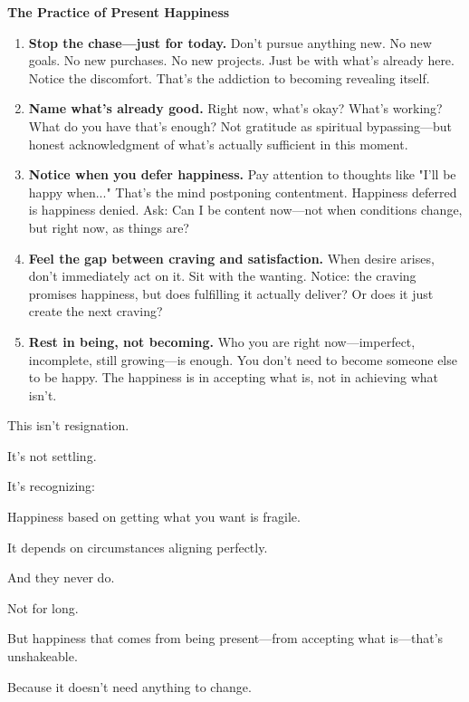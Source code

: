 \documentclass[11pt,twoside]{book}
\begin{document}
\begin{practicebox}
\textbf{The Practice of Present Happiness}

\begin{enumerate}
\item \textbf{Stop the chase—just for today.} Don't pursue anything new. No new goals. No new purchases. No new projects. Just be with what's already here. Notice the discomfort. That's the addiction to becoming revealing itself.

\item \textbf{Name what's already good.} Right now, what's okay? What's working? What do you have that's enough? Not gratitude as spiritual bypassing—but honest acknowledgment of what's actually sufficient in this moment.

\item \textbf{Notice when you defer happiness.} Pay attention to thoughts like "I'll be happy when..." That's the mind postponing contentment. Happiness deferred is happiness denied. Ask: Can I be content now—not when conditions change, but right now, as things are?

\item \textbf{Feel the gap between craving and satisfaction.} When desire arises, don't immediately act on it. Sit with the wanting. Notice: the craving promises happiness, but does fulfilling it actually deliver? Or does it just create the next craving?

\item \textbf{Rest in being, not becoming.} Who you are right now—imperfect, incomplete, still growing—is enough. You don't need to become someone else to be happy. The happiness is in accepting what is, not in achieving what isn't.
\end{enumerate}
\end{practicebox}

This isn't resignation.

It's not settling.

It's recognizing:

Happiness based on getting what you want is fragile.

It depends on circumstances aligning perfectly.

And they never do.

Not for long.

But happiness that comes from being present—from accepting what is—that's unshakeable.

Because it doesn't need anything to change.
\end{document}
